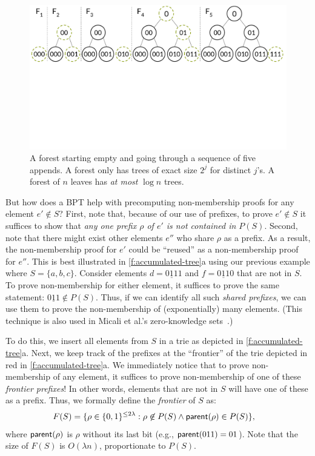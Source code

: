 \begin{figure}[t]
    \centering
    \includegraphics[width=1\columnwidth]{figures/forest.pdf}
    \vspace{-3.4cm}
    \caption{
        A forest starting empty and going through a sequence of five appends.
        A forest only has trees of exact size $2^j$ for distinct $j$'s.
        A forest of $n$ leaves has \textit{at most} $\log{n}$ trees. 
    }
    \label{f:forest}
    \vspace{-1.55em}
\end{figure}

But how does a BPT help with precomputing non-membership proofs for any element $e'\notin S$?
First, note that, because of our use of prefixes, to prove $e'\notin S$ it suffices to show that \textit{any one prefix $\rho$ of $e'$ is not contained in $P(S)$}.
Second, note that there might exist other elements $e''$ who share $\rho$ as a prefix.
As a result, the non-membership proof for $e'$ could be ``reused'' as a non-membership proof for $e''$.
This is best illustrated in \cref{f:accumulated-tree}a using our previous example where $S =\{a,b,c\}$.
Consider elements $d= \underline{011}1$ and $f = \underline{011}0$ that are not in $S$.
To prove non-membership for either element, it suffices to prove the same statement: $\underline{011}\notin P(S)$.
Thus, if we can identify all such \textit{shared prefixes}, we can use them to prove the non-membership of (exponentially) many elements.
(This technique is also used in Micali et al.'s zero-knowledge sets~\cite{zks}.)

To do this, we insert all elements from $S$ in a trie as depicted in \cref{f:accumulated-tree}a.
Next, we keep track of the prefixes at the ``frontier'' of the trie depicted in red in \cref{f:accumulated-tree}a.
We immediately notice that to prove non-membership of any element, it suffices to prove non-membership of one of these \textit{frontier prefixes}!
In other words, elements that are not in $S$ will have one of these as a prefix.
Thus, we formally define the \textit{frontier} of $S$ as:
\begin{align*}
    F(S) &= \{\rho \in \{0,1\}^{\le 2\lambda}: {\rho\not \in P(S)} \wedge {\ensuremath{\mathsf{parent}}(\rho) \in P(S)}\}\text{,}
\end{align*}
where $\mathsf{parent}(\rho)$ is $\rho$ without its last bit (e.g., $\mathsf{parent}(011) = 01$).
Note that the size of $F(S)$ is $O(\lambda n)$, proportionate to $P(S)$.

